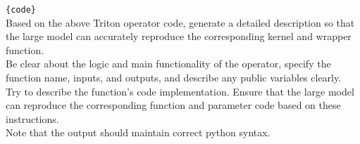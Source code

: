 

\begin{tcolorbox}[colframe=gray!80!black, colback=gray!10!white, title=Instruction Prompt]
\small
\texttt{\{code\}}\\ \justifying %
Based on the above Triton operator code, generate a detailed description so that the large model can accurately reproduce the corresponding kernel and wrapper function. \\
Be clear about the logic and main functionality of the operator, specify the function name, inputs, and outputs, and describe any public variables clearly. \\
Try to describe the function's code implementation. Ensure that the large model can reproduce the corresponding function and parameter code based on these instructions. \\
Note that the output should maintain correct python syntax. \\
\label{prompt_instru}
\end{tcolorbox}

